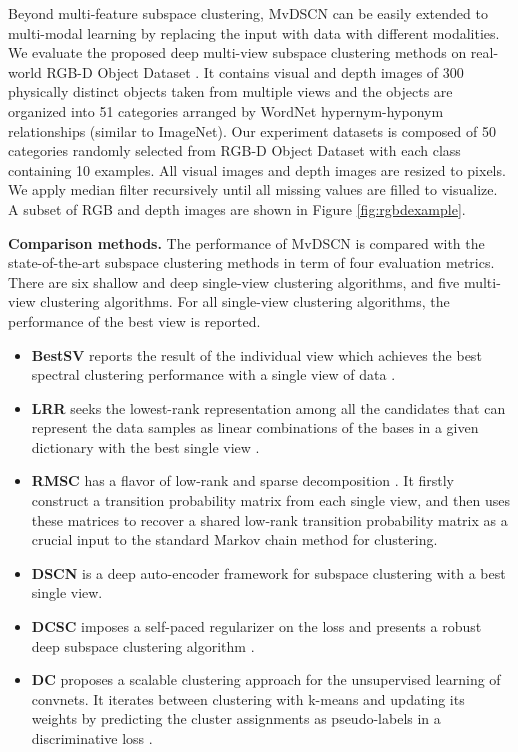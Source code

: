 \documentclass[journal]{IEEEtran}
\begin{document}
Beyond multi-feature subspace clustering, MvDSCN can be easily extended to multi-modal learning by replacing the input with data with different modalities.
We evaluate the proposed deep multi-view subspace clustering methods on real-world RGB-D Object Dataset \cite{Lai2011ALH}.
It contains visual and depth images of 300 physically distinct objects taken from multiple views and the objects are organized into 51 categories arranged by WordNet hypernym-hyponym relationships (similar to ImageNet).
Our experiment datasets is composed of 50 categories randomly selected from RGB-D Object Dataset with each class containing 10 examples.
All visual images and depth images are resized to  pixels.
We apply median filter recursively until all missing values are filled to visualize.
A subset of RGB and depth images are shown in Figure \ref{fig:rgbdexample}.

\textbf{Comparison methods.}
The performance of MvDSCN is compared with the state-of-the-art subspace clustering methods in term of four evaluation metrics.
There are six shallow and deep single-view clustering algorithms, and five multi-view clustering algorithms.
For all single-view clustering algorithms, the performance of the best view is reported.
\begin{itemize}
  \item {\textbf{BestSV}} reports the result of the individual view which achieves the best spectral clustering performance with a single view of data \cite{Ng2001OnSC}.
  \item {\textbf{LRR}} seeks the lowest-rank representation among all the candidates that can represent the data samples as linear combinations of the bases in a given dictionary with the best single view \cite{Guangcan2013Robust}.
  \item {\textbf{RMSC}} has a flavor of low-rank and sparse decomposition \cite{Xia2014RobustMS}.
It firstly construct a transition probability matrix from each single view, and then uses these matrices to recover a shared low-rank transition probability matrix as a crucial input to the standard Markov chain method for clustering.
  \item {\textbf{DSCN}} is a deep auto-encoder framework for subspace clustering with a best single view. \cite{Peng2016DeepSC}
  \item {\textbf{DCSC}} imposes a self-paced regularizer on the loss and presents a robust deep subspace clustering algorithm \cite{Jiang2018WhenTL}.
  \item {\textbf{DC}} proposes a scalable clustering approach for the unsupervised learning of convnets.
It iterates between clustering with k-means and updating its weights by predicting the cluster assignments as pseudo-labels in a discriminative loss
\cite{Caron2018DeepCF}.
\end{itemize}
\end{document}
